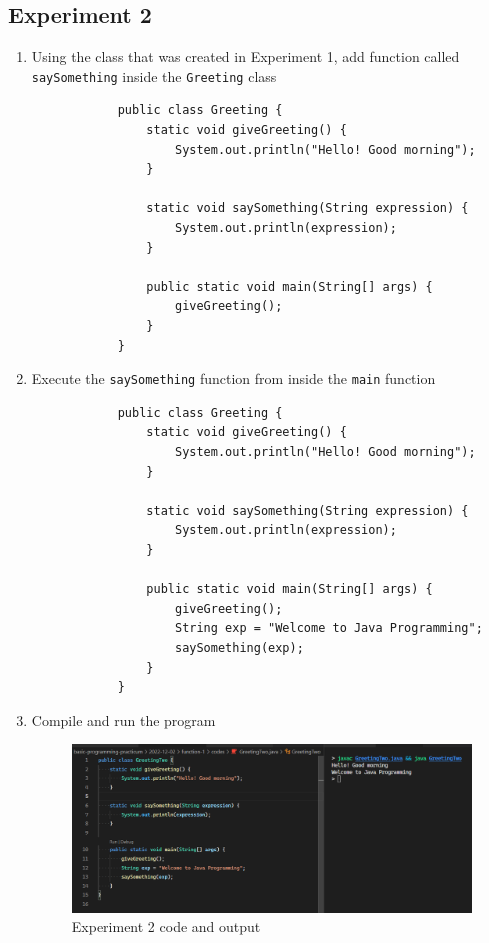 \documentclass[12pt,titlepage]{article}
\begin{document}
\subsection{Experiment 2}
\begin{enumerate}
    \item {
        Using the class that was created in Experiment 1, add function called\\
        \texttt{saySomething} inside the \texttt{Greeting} class

        \begin{verbatim}
            public class Greeting {
                static void giveGreeting() {
                    System.out.println("Hello! Good morning");
                }

                static void saySomething(String expression) {
                    System.out.println(expression);
                }

                public static void main(String[] args) {
                    giveGreeting();
                }
            }
        \end{verbatim}
    }
    \item {
        Execute the \texttt{saySomething} function from inside the \texttt{main} function

        \begin{verbatim}
            public class Greeting {
                static void giveGreeting() {
                    System.out.println("Hello! Good morning");
                }

                static void saySomething(String expression) {
                    System.out.println(expression);
                }

                public static void main(String[] args) {
                    giveGreeting();
                    String exp = "Welcome to Java Programming";
                    saySomething(exp);
                }
            }
        \end{verbatim}
    }
    \item {
        Compile and run the program

        \begin{figure}[h]
            \centering
            \includegraphics[width=.8\textwidth]{./images/greeting-two.png}
            \caption{Experiment 2 code and output}
        \end{figure}
    }
\end{enumerate}
\end{document}

